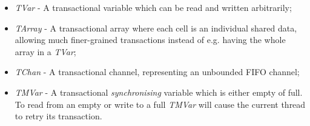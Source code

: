 \begin{itemize}
	\item \textit{TVar} - A transactional variable which can be read and written arbitrarily;
	\item \textit{TArray} - A transactional array where each cell is an individual shared data, allowing much finer-grained transactions instead of e.g. having the whole array in a \textit{TVar};
	\item \textit{TChan} - A transactional channel, representing an unbounded FIFO channel;
	\item \textit{TMVar} - A transactional \textit{synchronising} variable which is either empty of full. To read from an empty or write to a full \textit{TMVar} will cause the current thread to retry its transaction.
\end{itemize}


